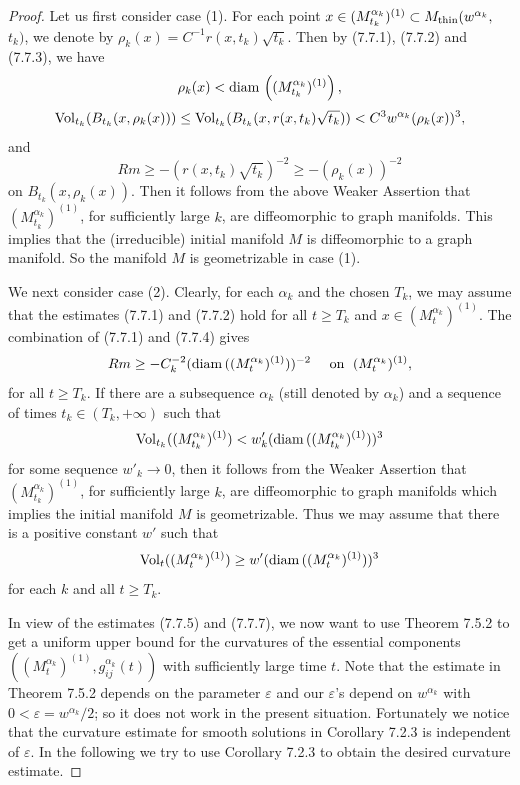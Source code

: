 \begin{proof}
Let us first consider case (1). For each point $x \in
(M^{\alpha_k}_{t_k})^{(1)} \subset M_{\rm thin}(w^{\alpha_k},$
${t_k})$, we denote by $\rho_k(x) = C^{-1}r(x,t_k)\sqrt{t_k}$.
Then by (7.7.1), (7.7.2) and (7.7.3), we have
$$
\rho_k(x) <{\rm diam}\,\left((M^{\alpha_k}_{t_k})^{(1)}\right),
$$
$$
\operatorname{Vol}_{t_k}(B_{t_k}(x,\rho_k(x))) \leq
\operatorname{Vol}_{t_k}(B_{t_k}(x,r(x,t_k)\sqrt{t_k}))<C^3w^{\alpha_k}(\rho_k(x))^3,
$$
and
$$
Rm\geq -(r(x,t_k)\sqrt{t_k})^{-2} \geq -(\rho_k(x))^{-2}
$$
on  $B_{t_k}(x,\rho_k(x)).$ Then it follows from the above Weaker
Assertion that $(M^{\alpha_k}_{t_k})^{(1)}$, for sufficiently
large $k$, are diffeomorphic to graph manifolds. This implies that
the (irreducible) initial manifold $M$ is diffeomorphic to a graph
manifold. So the manifold $M$ is geometrizable in case (1).

We next consider case (2). Clearly, for each $\alpha_k$ and the
chosen $T_k$, we may assume that the estimates (7.7.1) and (7.7.2)
hold for all $t \geq T_k$ and $x\in (M^{\alpha_k}_t)^{(1)}$. The
combination of (7.7.1) and (7.7.4) gives \begin{equation} Rm \geq
-C^{-2}_k({\rm diam}\,((M^{\alpha_k}_{t})^{(1)}))^{-2}
\quad \mbox{ on } \; (M^{\alpha_k}_{t})^{(1)}, %
\end{equation} for all $t \geq T_k$. If there are a subsequence $\alpha_k$
(still denoted by $\alpha_k$) and a sequence of times $t_k \in
(T_k,+\infty)$ such that \begin{equation}
\Vol_{t_k}((M^{\alpha_k}_{t_k})^{(1)}) <
w'_k({\rm diam}\,((M^{\alpha_k}_{t_k})^{(1)}))^3 %
\end{equation} for some sequence $w'_k \rightarrow 0$, then it follows from
the Weaker Assertion that $(M^{\alpha_k}_{t_k})^{(1)}$, for
sufficiently large $k$, are diffeomorphic to graph manifolds which
implies the initial manifold $M$ is geometrizable. Thus we may
assume that there is a positive constant $w'$ such that \begin{equation}
\Vol_t((M^{\alpha_k}_t)^{(1)})
\geq w'({\rm diam}\,((M^{\alpha_k}_t)^{(1)}))^3 %
\end{equation} for each $k$ and all $t \geq T_k$.

In view of the estimates (7.7.5) and (7.7.7), we now want to use
Theorem 7.5.2 to get a uniform upper bound  for the curvatures of
the essential components
$((M^{\alpha_k}_t)^{(1)},g^{\alpha_k}_{ij}(t))$ with sufficiently
large time $t$. Note that the estimate in Theorem 7.5.2 depends on
the parameter $\varepsilon$ and our $\varepsilon$'s depend on
$w^{\alpha_k}$ with $0<\varepsilon = {w^{\alpha_k}}/{2}$; so it
does not work in the present situation. Fortunately we notice that
the curvature estimate for smooth solutions in Corollary 7.2.3 is
independent of $\varepsilon$. In the following we try to use
Corollary 7.2.3 to obtain the desired curvature estimate.


\end{proof}
